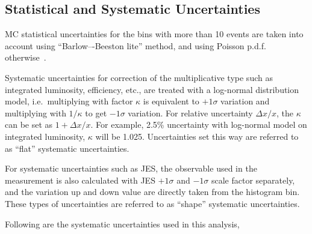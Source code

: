 \subsection{
  Statistical and Systematic Uncertainties
}

\gls{MC} statistical uncertainties for the bins with more than 10 events
are taken into account using ``Barlow–-Beeston lite'' method,
and using Poisson \gls{p.d.f.} otherwise~\cite{Barlow1993}.

Systematic uncertainties
for correction of the multiplicative type such as integrated luminosity, efficiency, etc.,
are treated with a log-normal distribution model,
i.e.~multiplying with factor \( \kappa \) is equivalent to
\( +1 \sigma \) variation and
multiplying with \( 1/\kappa \) to get \( -1\sigma \) variation. For relative
uncertainty \(\Delta x / x \), the \( \kappa \) can be set as \( 1 + \Delta x / x \).
For example, 2.5\% uncertainty with log-normal model on integrated luminosity,
\( \kappa \) will be 1.025. Uncertainties set this way
are referred to as ``flat'' systematic uncertainties.

For systematic uncertainties such as \gls{JES}, the observable
used in the measurement is also calculated with \gls{JES} \( +1\sigma \)
and \( -1\sigma \) scale factor separately, and the variation up and down
value are directly taken from the histogram bin. These types of uncertainties
are referred to as ``shape'' systematic uncertainties.

Following are the systematic uncertainties used in this analysis,

